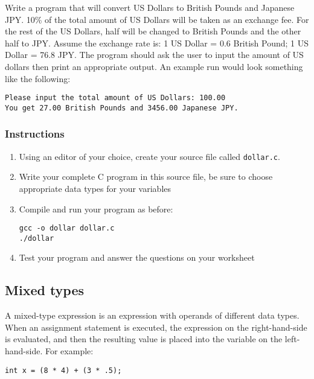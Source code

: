 \documentclass[12pt]{scrartcl}
\begin{document}
Write a program that will convert US Dollars to British Pounds and 
Japanese JPY.  10\% of the total amount of US Dollars will be taken 
as an exchange fee.  For the rest of the US Dollars, half will be 
changed to British Pounds and the other half to JPY.  Assume the 
exchange rate is: 1 US Dollar = 0.6 British Pound; 1 US Dollar = 
76.8 JPY.  The program should ask the user to input the amount 
of US dollars then print an appropriate output.  An example run 
would look something like the following:

\begin{verbatim}
Please input the total amount of US Dollars: 100.00
You get 27.00 British Pounds and 3456.00 Japanese JPY.
\end{verbatim}

\subsubsection*{Instructions}

\begin{enumerate}
  \item Using an editor of your choice, create your source file 
	called \texttt{dollar.c}.
  \item Write your complete C program in this source file, be sure 
  	to choose appropriate data types for your variables
  \item Compile and run your program as before:
	
\begin{verbatim}
gcc -o dollar dollar.c
./dollar  
\end{verbatim}
  \item Test your program and answer the questions on your worksheet
\end{enumerate} 

\subsection{Mixed types}

A mixed-type expression is an expression with operands of different 
data types. When an assignment statement is executed, the expression 
on the right-hand-side is evaluated, and then the resulting value is 
placed into the variable on the left-hand-side.  For example:

\begin{verbatim}
int x = (8 * 4) + (3 * .5);
\end{verbatim}
\end{document}
